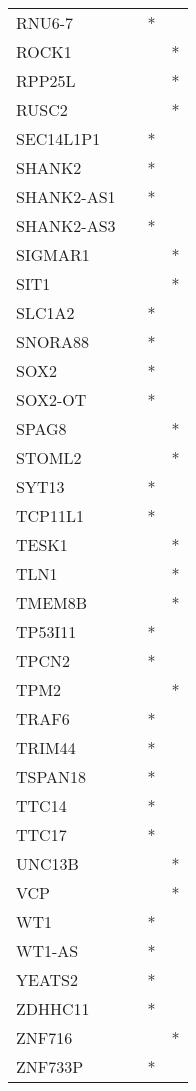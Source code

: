 \begin{longtable}{lccc}
RNU6-7        &       &  * &         \\
ROCK1         &       &    &       * \\
RPP25L        &       &    &       * \\
RUSC2         &       &    &       * \\
SEC14L1P1     &       &  * &         \\
SHANK2        &       &  * &         \\
SHANK2-AS1    &       &  * &         \\
SHANK2-AS3    &       &  * &         \\
SIGMAR1       &       &    &       * \\
SIT1          &       &    &       * \\
SLC1A2        &       &  * &         \\
SNORA88       &       &  * &         \\
SOX2          &       &  * &         \\
SOX2-OT       &       &  * &         \\
SPAG8         &       &    &       * \\
STOML2        &       &    &       * \\
SYT13         &       &  * &         \\
TCP11L1       &       &  * &         \\
TESK1         &       &    &       * \\
TLN1          &       &    &       * \\
TMEM8B        &       &    &       * \\
TP53I11       &       &  * &         \\
TPCN2         &       &  * &         \\
TPM2          &       &    &       * \\
TRAF6         &       &  * &         \\
TRIM44        &       &  * &         \\
TSPAN18       &       &  * &         \\
TTC14         &       &  * &         \\
TTC17         &       &  * &         \\
UNC13B        &       &    &       * \\
VCP           &       &    &       * \\
WT1           &       &  * &         \\
WT1-AS        &       &  * &         \\
YEATS2        &       &  * &         \\
ZDHHC11       &       &  * &         \\
ZNF716        &       &    &       * \\
ZNF733P       &       &  * &         \\
\end{longtable}
